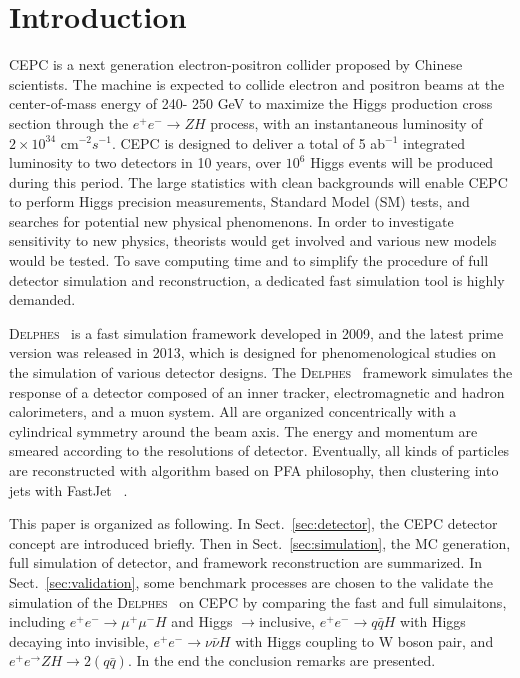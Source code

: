 \documentclass[a4paper,10pt,twoside]{cpc-hepnp}
\begin{document}



\section{Introduction}\label{sec:intro}
CEPC\cite{ref:cepc_det, ref:cepc_acc} is a next generation electron-positron collider proposed by Chinese scientists.
The machine is expected to collide electron and positron beams at the center-of-mass energy of 240- 250 GeV to maximize the Higgs production cross section through the $e^+e^− \to ZH$ process, with an instantaneous luminosity of $2\times10^{34}$ cm$^{-2} s^{-1}$.
CEPC is designed to deliver a total of 5 ab$^{-1}$ integrated luminosity to two detectors in 10 years, over $10^6$ Higgs events will be produced during this period. 
The large statistics with clean backgrounds will enable CEPC to perform Higgs precision measurements, 
Standard Model (SM) tests, and searches for potential new physical phenomenons.
 In order to investigate  sensitivity to new physics, theorists would get involved and various new models would be tested. To save computing time and to simplify  the procedure of full detector simulation and reconstruction,  a dedicated fast simulation tool is highly demanded. 

{\textsc{Delphes}~}\cite{ref:delphes} is a fast simulation framework  developed in 2009, and the latest prime version was released in 2013, which is designed for phenomenological studies on the simulation of various detector designs.  The {\textsc{Delphes}~} framework simulates the response of a detector composed of an inner tracker, electromagnetic and hadron calorimeters, and a muon system. All are organized concentrically with a cylindrical symmetry around the beam axis. The energy and momentum are smeared according to the resolutions of detector. Eventually, all kinds of particles are reconstructed with algorithm based on PFA\cite{ref:pfa} philosophy, then clustering into jets with FastJet~\cite{ref:fastjet} .

This paper is organized as following.  In Sect.{~\ref{sec:detector}}, the CEPC detector concept are introduced briefly.  Then in Sect.{~\ref{sec:simulation}}, the MC generation, full simulation of detector,  and framework reconstruction are summarized. In Sect.{~\ref{sec:validation}}, some benchmark processes are chosen to the validate the simulation of  the {\textsc{Delphes}~} on CEPC by comparing the fast and full simulaitons, including  $e^+e^- \to \mu^+\mu^- H$  and Higgs $\to $inclusive, $e^+e^- \to q\bar{q} H$ with Higgs decaying into invisible, $e^+e^- \to \nu\bar{\nu} H$ with Higgs coupling to W boson pair, and $e^+e^\to ZH \to 2(q\bar{q})$. In the end the conclusion remarks are presented. 
\end{document}
